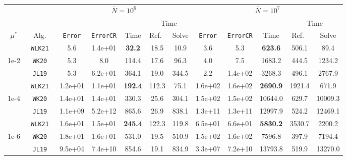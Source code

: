\begin{tabular}{ccccccc|ccccc}%
\toprule
& & \multicolumn{5}{c}{$\bar N = 10^6$} & \multicolumn{5}{c}{$\bar N = 10^7$} \\
\cmidrule(lr){3-7} \cmidrule(lr){8-12}
& & & & & \multicolumn{2}{c}{Time} & & & & \multicolumn{2}{c}{Time} \\
\cmidrule(lr){6-7} \cmidrule(lr){11-12}
$\bar\mu^*$   & Alg.        & \texttt{Error} & \texttt{ErrorCR} & Time      & Ref.\ & Solve & \texttt{Error} & \texttt{ErrorCR} & Time     & Ref.\  & Solve \\
\midrule
& \texttt{ WLK21 }&  5.6&  1.4e+01& \textbf{ 32.2 }&  18.5&  10.9&  3.6&  5.3& \textbf{ 623.6 }&  506.1&  89.4 \\
1e-2& \texttt{ WK20 }&  5.3&  8.0&  114.4&  17.6&  96.3&  4.0&  7.5&  1683.2&  444.5&  1234.2 \\
& \texttt{ JL19 }&  5.3&  6.2e+01&  364.1&  19.0&  344.5&  2.2&  1.4e+02&  3268.3&  496.1&  2767.9 \\
\midrule
& \texttt{ WLK21 }&  1.2e+01&  1.1e+01& \textbf{ 192.4 }&  112.3&  75.1&  1.6e+02&  1.6e+02& \textbf{ 2690.9 }&  1921.4&  671.9 \\
1e-4& \texttt{ WK20 }&  1.4e+01&  1.4e+01&  330.3&  25.6&  304.1&  1.5e+02&  1.5e+02&  10644.0&  629.7&  10009.3 \\
& \texttt{ JL19 }&  1.1e+09&  5.2e+12&  865.6&  26.9&  838.1&  1.3e+11&  1.3e+11&  12997.9&  524.2&  12469.1 \\
\midrule
& \texttt{ WLK21 }&  1.6e+01&  1.5e+01& \textbf{ 245.4 }&  122.3&  119.8&  6.5e+01&  6.6e+01& \textbf{ 5830.2 }&  3530.7&  2200.2 \\
1e-6& \texttt{ WK20 }&  1.8e+01&  1.6e+01&  531.0&  19.5&  510.9&  1.5e+02&  1.6e+02&  7596.8&  397.9&  7194.4 \\
& \texttt{ JL19 }&  9.5e+04&  7.4e+10&  854.6&  19.1&  834.9&  3.3e+07&  7.2e+10&  13793.8&  519.9&  13270.0 \\
\bottomrule
\end{tabular}
